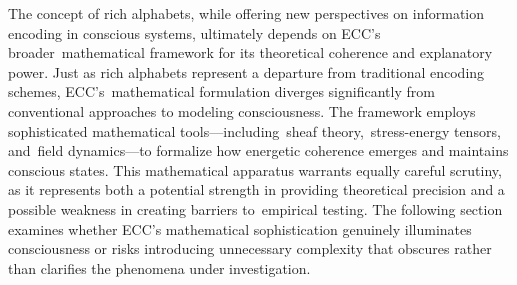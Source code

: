 The concept of rich alphabets, while offering new perspectives on information encoding in conscious systems, ultimately depends on ECC's broader~mathematical framework for its theoretical coherence and explanatory power. Just as rich alphabets represent a departure from traditional encoding schemes, ECC's~mathematical formulation diverges significantly from conventional approaches to modeling consciousness. The framework employs sophisticated mathematical tools—including~sheaf theory,~stress-energy tensors, and~field dynamics—to formalize how energetic coherence emerges and maintains conscious states. This mathematical apparatus warrants equally careful scrutiny, as it represents both a potential strength in providing theoretical precision and a possible weakness in creating barriers to~empirical testing. The following section examines whether ECC's mathematical sophistication genuinely illuminates consciousness or risks introducing unnecessary complexity that obscures rather than clarifies the phenomena under investigation.
